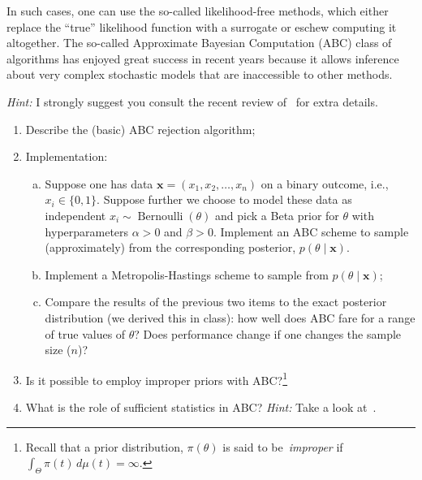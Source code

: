 \documentclass[a4paper,10pt, notitlepage]{report}
\begin{document}
In such cases, one can use the so-called likelihood-free methods, which either replace the ``true'' likelihood function with a surrogate or eschew computing it altogether.
The so-called Approximate Bayesian Computation (ABC) class of algorithms has enjoyed great success in recent years because it allows inference about very complex stochastic models that are inaccessible to other methods.

\textit{Hint:} I strongly suggest you consult the recent review of~\cite{Beaumont2019} for extra details. 
\begin{enumerate}
 \item Describe the (basic) ABC rejection algorithm;
 \item Implementation:
\begin{enumerate}[(a)]
  \item Suppose one has data $\boldsymbol{x} = (x_1, x_2, \ldots, x_n)$ on a binary outcome, i.e., $x_i \in \{0, 1\}$.
  Suppose further we choose to model these data as independent $x_i \sim \operatorname{Bernoulli}(\theta)$ and pick a Beta prior for $\theta$ with hyperparameters $\alpha>0$ and $\beta>0$.  
  Implement an ABC scheme to sample (approximately) from the corresponding posterior, $p(\theta \mid \boldsymbol{x})$.
  \item Implement a Metropolis-Hastings scheme to sample from $p(\theta \mid \boldsymbol{x})$;
  \item Compare the results of the previous two items to the exact posterior distribution (we derived this in class): how well does ABC fare for a range of true values of $\theta$? 
  Does performance change if one changes the sample size ($n$)?
 \end{enumerate} 
 \item Is it possible to employ improper priors with ABC?\footnote{Recall that a prior distribution, $\pi(\theta)$ is said to be~\textit{improper} if $\int_{\Theta} \pi(t)\,d\mu(t) = \infty$.}
 \item What is the role of sufficient statistics in ABC? 
 \textit{Hint:} Take a look at~\cite{Robert2011}.
\end{enumerate}
 


\end{document}
